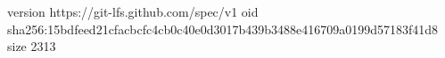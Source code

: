 version https://git-lfs.github.com/spec/v1
oid sha256:15bdfeed21cfacbcfc4cb0c40e0d3017b439b3488e416709a0199d57183f41d8
size 2313
